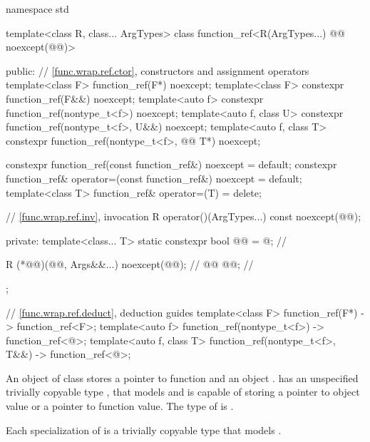 %
\begin{codeblock}
namespace std {
  template<class R, class... ArgTypes>
  class function_ref<R(ArgTypes...) @\cv{}@ noexcept(@@)> {
  public:
    // \ref{func.wrap.ref.ctor}, constructors and assignment operators
    template<class F> function_ref(F*) noexcept;
    template<class F> constexpr function_ref(F&&) noexcept;
    template<auto f> constexpr function_ref(nontype_t<f>) noexcept;
    template<auto f, class U> constexpr function_ref(nontype_t<f>, U&&) noexcept;
    template<auto f, class T> constexpr function_ref(nontype_t<f>, @\cv{}@ T*) noexcept;

    constexpr function_ref(const function_ref&) noexcept = default;
    constexpr function_ref& operator=(const function_ref&) noexcept = default;
    template<class T> function_ref& operator=(T) = delete;

    // \ref{func.wrap.ref.inv}, invocation
    R operator()(ArgTypes...) const noexcept(@@);

  private:
    template<class... T>
      static constexpr bool @@ = @\seebelownc@;     // \expos

    R (*@@)(@@, Args&&...) noexcept(@@);  // \expos
    @@ @@;                               // \expos
  };

  // \ref{func.wrap.ref.deduct}, deduction guides
  template<class F>
    function_ref(F*) -> function_ref<F>;
  template<auto f>
    function_ref(nontype_t<f>) -> function_ref<@\seebelow@>;
  template<auto f, class T>
    function_ref(nontype_t<f>, T&&) -> function_ref<@\seebelow@>;
}
\end{codeblock}

\pnum
An object of class
stores a pointer to function  and
an object .
 has
an unspecified trivially copyable type , that
models  and
is capable of storing a pointer to object value or a pointer to function value.
The type of  is
.

\pnum
Each specialization of  is
a trivially copyable type
that models .

